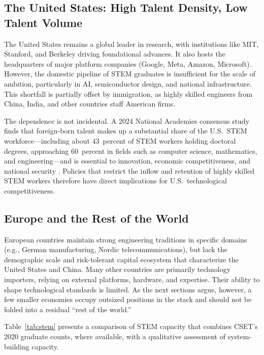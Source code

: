 \documentclass[12pt,letterpaper]{article}
\begin{document}
\subsection{The United States: High Talent Density, Low Talent Volume}

The United States remains a global leader in research, with institutions like MIT, Stanford, and Berkeley driving foundational advances. It also hosts the headquarters of major platform companies (Google, Meta, Amazon, Microsoft). However, the domestic pipeline of STEM graduates is insufficient for the scale of ambition, particularly in AI, semiconductor design, and national infrastructure. This shortfall is partially offset by immigration, as highly skilled engineers from China, India, and other countries staff American firms.

The dependence is not incidental. A 2024 National Academies consensus study finds that foreign-born talent makes up a substantial share of the U.S.\ STEM workforce---including about 43~percent of STEM workers holding doctoral degrees, approaching 60~percent in fields such as computer science, mathematics, and engineering---and is essential to innovation, economic competitiveness, and national security \cite{nasem2024}. Policies that restrict the inflow and retention of highly skilled STEM workers therefore have direct implications for U.S.\ technological competitiveness.

\subsection{Europe and the Rest of the World}

European countries maintain strong engineering traditions in specific domains (e.g., German manufacturing, Nordic telecommunications), but lack the demographic scale and risk-tolerant capital ecosystem that characterize the United States and China. Many other countries are primarily technology importers, relying on external platforms, hardware, and expertise. Their ability to shape technological standards is limited. As the next sections argue, however, a few smaller economies occupy outsized positions in the stack and should not be folded into a residual ``rest of the world.''

Table~\ref{tab:stem} presents a comparison of STEM capacity that combines CSET's 2020 graduate counts, where available, with a qualitative assessment of system-building capacity.
\end{document}
